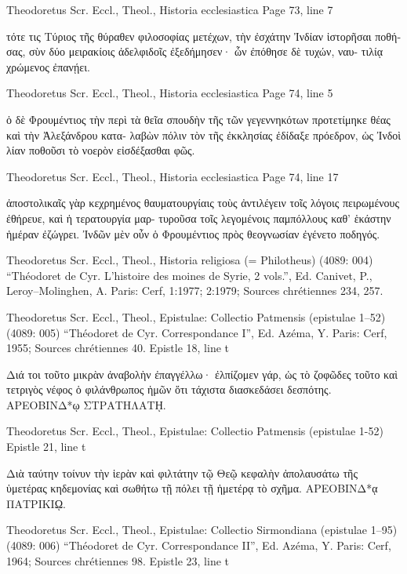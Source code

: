 \documentclass[12pt,letterpaper,twoside,final]{memoir}
\begin{document}
\begin{greek}
Theodoretus Scr. Eccl., Theol., Historia ecclesiastica 
Page 73, line 7

                                       τότε τις Τύριος τῆς θύραθεν 
φιλοσοφίας μετέχων, τὴν ἐσχάτην Ἰνδίαν ἱστορῆσαι ποθήσας, σὺν 
δύο μειρακίοις ἀδελφιδοῖς ἐξεδήμησεν· ὧν ἐπόθησε δὲ τυχών, ναυ-
τιλίᾳ χρώμενος ἐπανῄει. 



Theodoretus Scr. Eccl., Theol., Historia ecclesiastica 
Page 74, line 5

                         ὁ δὲ Φρουμέντιος τὴν περὶ τὰ θεῖα σπουδὴν 
τῆς τῶν γεγεννηκότων προτετίμηκε θέας καὶ τὴν Ἀλεξάνδρου κατα-
λαβὼν πόλιν τὸν τῆς ἐκκλησίας ἐδίδαξε πρόεδρον, ὡς Ἰνδοὶ λίαν 
ποθοῦσι τὸ νοερὸν εἰσδέξασθαι φῶς. 



Theodoretus Scr. Eccl., Theol., Historia ecclesiastica 
Page 74, line 17

                   ἀποστολικαῖς γὰρ κεχρημένος θαυματουργίαις τοὺς 
ἀντιλέγειν τοῖς λόγοις πειρωμένους ἐθήρευε, καὶ ἡ τερατουργία μαρ-
τυροῦσα τοῖς λεγομένοις παμπόλλους καθ' ἑκάστην ἡμέραν ἐζώγρει. 
 Ἰνδῶν μὲν οὖν ὁ Φρουμέντιος πρὸς θεογνωσίαν ἐγένετο ποδηγός. 



Theodoretus Scr. Eccl., Theol., Historia religiosa (= Philotheus) (4089: 004)
“Théodoret de Cyr. L'histoire des moines de Syrie, 2 vols.”, Ed. Canivet, P., Leroy–Molinghen, A.
Paris: Cerf, 1:1977; 2:1979; Sources chrétiennes 234, 257.




Theodoretus Scr. Eccl., Theol., Epistulae: Collectio Patmensis (epistulae 1–52) (4089: 005)
“Théodoret de Cyr. Correspondance I”, Ed. Azéma, Y.
Paris: Cerf, 1955; Sources chrétiennes 40.
Epistle 18, line t

                                                               Διά 
τοι τοῦτο μικρὰν ἀναβολὴν ἐπαγγέλλω· ἐλπίζομεν γάρ, ὡς τὸ 
ζοφῶδες τοῦτο καὶ τετριγὸς νέφος ὁ φιλάνθρωπος ἡμῶν ὅτι 
τάχιστα διασκεδάσει δεσπότης. 
ΑΡΕΟΒΙΝΔ*ῳ ΣΤΡΑΤΗΛΑΤῌ. 




Theodoretus Scr. Eccl., Theol., Epistulae: Collectio Patmensis (epistulae 1-52) 
Epistle 21, line t

             Διὰ ταύτην τοίνυν τὴν ἱερὰν καὶ φιλτάτην τῷ Θεῷ 
κεφαλὴν ἀπολαυσάτω τῆς ὑμετέρας κηδεμονίας καὶ σωθήτω 
τῇ πόλει τῇ ἡμετέρᾳ τὸ σχῆμα. 
ΑΡΕΟΒΙΝΔ*ᾳ ΠΑΤΡΙΚΙῼ. 




Theodoretus Scr. Eccl., Theol., Epistulae: Collectio Sirmondiana (epistulae 1–95) (4089: 006)
“Théodoret de Cyr. Correspondance II”, Ed. Azéma, Y.
Paris: Cerf, 1964; Sources chrétiennes 98.
Epistle 23, line t


\end{greek}
\end{document}
